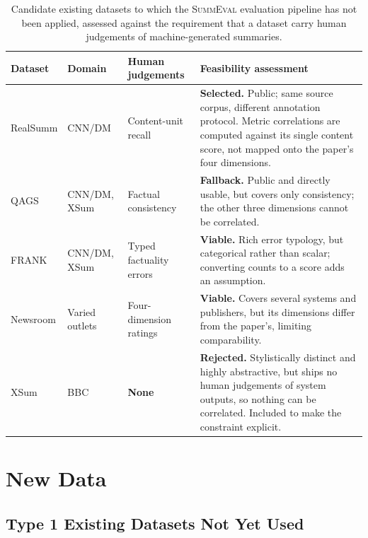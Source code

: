 \documentclass[11pt]{article}
\begin{document}
\begin{table}[t]
  \centering
  \small
  \begin{tabularx}{\textwidth}{lll>{\raggedright\arraybackslash}X}
    \toprule
    \textbf{Dataset} & \textbf{Domain} & \textbf{Human judgements} & \textbf{Feasibility assessment} \\
    \midrule
    RealSumm \citep{bhandari-etal-2020-reevaluating}
      & CNN/DM & Content-unit recall
      & \textbf{Selected.} Public; same source corpus, different annotation
        protocol. Metric correlations are computed against its single content
        score, not mapped onto the paper's four dimensions. \\
    \addlinespace
    QAGS \citep{wang-etal-2020-asking}
      & CNN/DM, XSum & Factual consistency
      & \textbf{Fallback.} Public and directly usable, but covers only
        consistency; the other three dimensions cannot be correlated. \\
    \addlinespace
    FRANK \citep{pagnoni-etal-2021-understanding}
      & CNN/DM, XSum & Typed factuality errors
      & \textbf{Viable.} Rich error typology, but categorical rather than
        scalar; converting counts to a score adds an assumption. \\
    \addlinespace
    Newsroom \citep{grusky-etal-2018-newsroom}
      & Varied outlets & Four-dimension ratings
      & \textbf{Viable.} Covers several systems and publishers, but its
        dimensions differ from the paper's, limiting comparability. \\
    \addlinespace
    XSum \citep{narayan-etal-2018-dont}
      & BBC & \textbf{None}
      & \textbf{Rejected.} Stylistically distinct and highly abstractive, but
        ships no human judgements of system outputs, so nothing can be
        correlated. Included to make the constraint explicit. \\
    \bottomrule
  \end{tabularx}
  \caption{Candidate existing datasets to which the \textsc{SummEval}
    evaluation pipeline has not been applied, assessed against the
    requirement that a dataset carry human judgements of machine-generated
    summaries.}
  \label{tab:candidates}
\end{table}

\section{New Data}
\label{sec:newdata}

\subsection{Type 1 Existing Datasets Not Yet Used}
\label{sec:newdata-existing}
\end{document}
